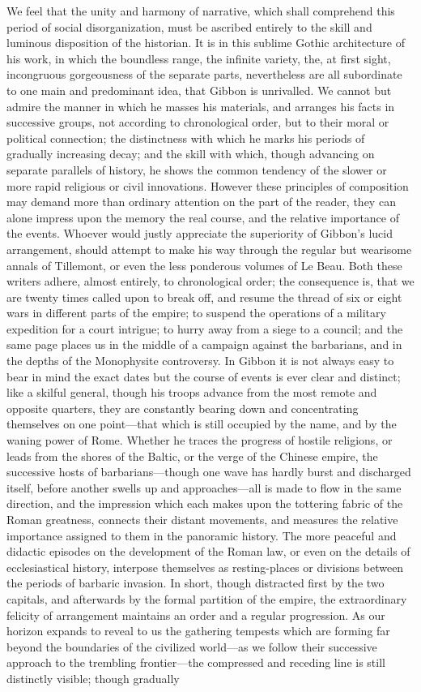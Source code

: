 We feel that the unity and harmony of narrative, which shall comprehend this period of social disorganization, must be ascribed entirely to the skill and luminous disposition of the historian. It is in this sublime Gothic architecture of his work, in which the boundless range, the infinite variety, the, at first sight, incongruous gorgeousness of the separate parts, nevertheless are all subordinate to one main and predominant idea, that Gibbon is unrivalled. We cannot but admire the manner in which he masses his materials, and arranges his facts in successive groups, not according to chronological order, but to their moral or political connection; the distinctness with which he marks his periods of gradually increasing decay; and the skill with which, though advancing on separate parallels of history, he shows the common tendency of the slower or more rapid religious or civil innovations. However these principles of composition may demand more than ordinary attention on the part of the reader, they can alone impress upon the memory the real course, and the relative importance of the events. Whoever would justly appreciate the superiority of Gibbon’s lucid arrangement, should attempt to make his way through the regular but wearisome annals of Tillemont, or even the less ponderous volumes of Le Beau. Both these writers adhere, almost entirely, to chronological order; the consequence is, that we are twenty times called upon to break off, and resume the thread of six or eight wars in different parts of the empire; to suspend the operations of a military expedition for a court intrigue; to hurry away from a siege to a council; and the same page places us in the middle of a campaign against the barbarians, and in the depths of the Monophysite controversy. In Gibbon it is not always easy to bear in mind the exact dates but the course of events is ever clear and distinct; like a skilful general, though his troops advance from the most remote and opposite quarters, they are constantly bearing down and concentrating themselves on one point—that which is still occupied by the name, and by the waning power of Rome. Whether he traces the progress of hostile religions, or leads from the shores of the Baltic, or the verge of the Chinese empire, the successive hosts of barbarians—though one wave has hardly burst and discharged itself, before another swells up and approaches—all is made to flow in the same direction, and the impression which each makes upon the tottering fabric of the Roman greatness, connects their distant movements, and measures the relative importance assigned to them in the panoramic history. The more peaceful and didactic episodes on the development of the Roman law, or even on the details of ecclesiastical history, interpose themselves as resting-places or divisions between the periods of barbaric invasion. In short, though distracted first by the two capitals, and afterwards by the formal partition of the empire, the extraordinary felicity of arrangement maintains an order and a regular progression. As our horizon expands to reveal to us the gathering tempests which are forming far beyond the boundaries of the civilized world—as we follow their successive approach to the trembling frontier—the compressed and receding line is still distinctly visible; though gradually 